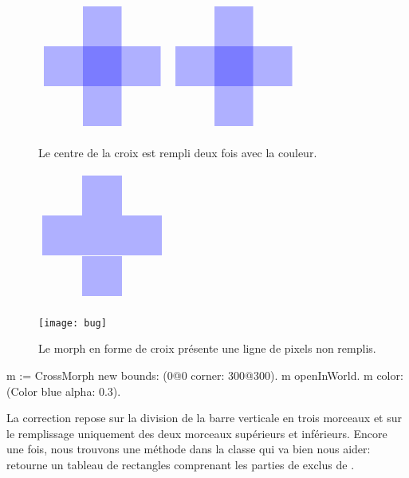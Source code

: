\documentclass[a4paper,10pt,twoside]{book}
\begin{document}
\begin{figure}[t]
\begin{minipage}{0.48\textwidth}
	\ifluluelse
		{\centerline{\includegraphics[scale=0.6]{overdrawBug}}}
		{\centerline{\includegraphics{overdrawBug}}}
	\caption{Le centre de la croix est rempli deux fois avec la
      couleur.	\label{fig:overdrawBug}}
\end{minipage}
\hfill
\begin{minipage}{0.48\textwidth}
	\ifluluelse
		{\centerline{\includegraphics[scale=0.6]{hairlineBug}}}
		{\centerline{\texttt{[image: bug]}}}
	\caption{Le morph en forme de croix pr\'esente une ligne de pixels
      non remplis.	\label{fig:bug}}
\end{minipage}
\end{figure}


\begin{code}{}
m := CrossMorph new bounds: (0@0 corner: 300@300).
m openInWorld.
m color: (Color blue alpha: 0.3).

\end{code}

\noindent
La correction repose sur la division de la barre verticale en trois
morceaux et sur le remplissage uniquement des deux morceaux
sup\'erieurs et inf\'erieurs.
Encore une fois, nous trouvons une m\'ethode dans la classe
 qui va bien nous aider:  
retourne un tableau de rectangles comprenant les parties de 
exclus de . 
\end{document}
